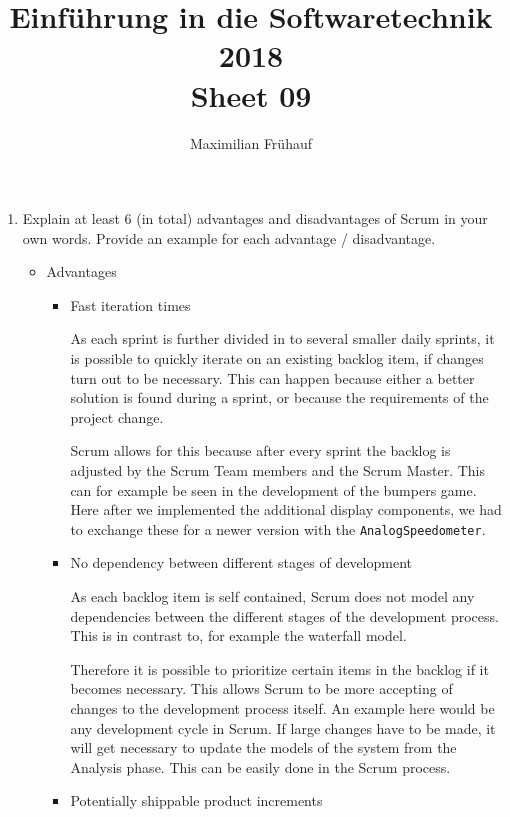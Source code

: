 \documentclass[a4paper, 10pt]{article}
\title{Einführung in die Softwaretechnik 2018 \\ Sheet 09}
\author{Maximilian Frühauf}
\begin{document}
\maketitle
\begin{enumerate}
    \item Explain at least 6 (in total) advantages and disadvantages of Scrum in your
    own words. Provide an example for each advantage / disadvantage.
    \vspace{0.5cm}

    \begin{itemize}
        \item Advantages
    \begin{itemize}
        \item Fast iteration times

            As each sprint is further divided in to several smaller daily sprints, 
            it is possible to quickly iterate on an existing backlog item, if changes turn out to 
            be necessary. This can happen because either a better solution is found during a sprint, 
            or because the requirements of the project change. 

            Scrum allows for this because after every sprint the backlog is adjusted by the Scrum Team members
            and the Scrum Master. 
            This can for example be seen in the development of the bumpers game. Here after we implemented the 
            additional display components, we had to exchange these for a newer version with the \verb+AnalogSpeedometer+.
            
        \item No dependency between different stages of development

            As each backlog item is self contained, Scrum does not model any dependencies between the 
            different stages of the development process. This is in contrast to, for example the waterfall model.

            Therefore it is possible to prioritize certain items in the backlog if it becomes necessary. 
            This allows Scrum to be more accepting of changes to the development process itself.
            An example here would be any development cycle in Scrum. If large changes have to be made, it will get
            necessary to update the models of the system from the Analysis phase. This can be easily done in the Scrum process.
        \item Potentially shippable product increments


\end{itemize}
\end{itemize}
\end{enumerate}
\end{document}
